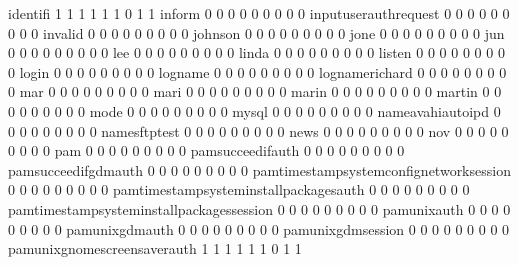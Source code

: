 \documentclass[compress,8pt]{beamer}
\begin{document}
\begin{frame}
\begin{Schunk}
  identifi                                   1   1   1   1   1   1   0   1   1
  inform                                     0   0   0   0   0   0   0   0   0
  inputuserauthrequest                       0   0   0   0   0   0   0   0   0
  invalid                                    0   0   0   0   0   0   0   0   0
  johnson                                    0   0   0   0   0   0   0   0   0
  jone                                       0   0   0   0   0   0   0   0   0
  jun                                        0   0   0   0   0   0   0   0   0
  lee                                        0   0   0   0   0   0   0   0   0
  linda                                      0   0   0   0   0   0   0   0   0
  listen                                     0   0   0   0   0   0   0   0   0
  login                                      0   0   0   0   0   0   0   0   0
  logname                                    0   0   0   0   0   0   0   0   0
  lognamerichard                             0   0   0   0   0   0   0   0   0
  mar                                        0   0   0   0   0   0   0   0   0
  mari                                       0   0   0   0   0   0   0   0   0
  marin                                      0   0   0   0   0   0   0   0   0
  martin                                     0   0   0   0   0   0   0   0   0
  mode                                       0   0   0   0   0   0   0   0   0
  mysql                                      0   0   0   0   0   0   0   0   0
  nameavahiautoipd                           0   0   0   0   0   0   0   0   0
  namesftptest                               0   0   0   0   0   0   0   0   0
  news                                       0   0   0   0   0   0   0   0   0
  nov                                        0   0   0   0   0   0   0   0   0
  pam                                        0   0   0   0   0   0   0   0   0
  pamsucceedifauth                           0   0   0   0   0   0   0   0   0
  pamsucceedifgdmauth                        0   0   0   0   0   0   0   0   0
  pamtimestampsystemconfignetworksession     0   0   0   0   0   0   0   0   0
  pamtimestampsysteminstallpackagesauth      0   0   0   0   0   0   0   0   0
  pamtimestampsysteminstallpackagessession   0   0   0   0   0   0   0   0   0
  pamunixauth                                0   0   0   0   0   0   0   0   0
  pamunixgdmauth                             0   0   0   0   0   0   0   0   0
  pamunixgdmsession                          0   0   0   0   0   0   0   0   0
  pamunixgnomescreensaverauth                1   1   1   1   1   1   0   1   1

\end{Schunk}
\end{frame}
\end{document}
